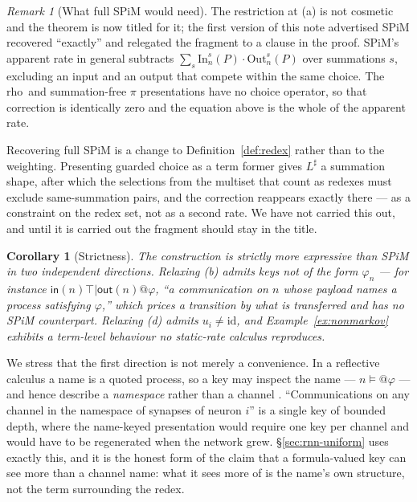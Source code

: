 \documentclass[11pt,a4paper]{article}
\theoremstyle{plain}
\newtheorem{corollary}[theorem]{Corollary}
\theoremstyle{definition}
\theoremstyle{remark}
\newtheorem{remark}[theorem]{Remark}
\newcommand{\rhoc}{\textsf{rho}}
\newcommand{\sepc}{\mathbin{\big|}}
\newcommand{\out}{\mathsf{out}}
\newcommand{\inn}{\mathsf{in}}
\begin{document}
\begin{remark}[What full SPiM would need]
\label{rem:spim-scope}
The restriction at (a) is not cosmetic and the theorem is now titled for it; the first version of
this note advertised SPiM recovered ``exactly'' and relegated the fragment to a clause in the proof.
SPiM's apparent rate in general subtracts $\sum_{s}\mathrm{In}_n^s(P)\cdot\mathrm{Out}_n^s(P)$ over
summations $s$, excluding an input and an output that compete within the same choice. The \rhoc\ and
summation-free $\pi$ presentations have no choice operator, so that correction is identically zero
and the equation above is the whole of the apparent rate.

Recovering full SPiM is a change to Definition~\ref{def:redex} rather than to the weighting.
Presenting guarded choice as a term former gives $L^\sharp$ a summation shape, after which the
selections from the multiset that count as redexes must exclude same-summation pairs, and the
correction reappears exactly there --- as a constraint on the redex set, not as a second rate. We
have not carried this out, and until it is carried out the fragment should stay in the title.
\end{remark}

\begin{corollary}[Strictness]
\label{cor:strict}
The construction is strictly more expressive than SPiM in two independent directions. Relaxing (b)
admits keys not of the form $\varphi_n$ --- for instance
$\inn(n)\top \sepc \out(n)@\varphi$, ``a communication on $n$ whose payload names a process
satisfying $\varphi$,'' which prices a transition by what is transferred and has no SPiM
counterpart. Relaxing (d) admits $u_i \neq \mathrm{id}$, and Example~\ref{ex:nonmarkov} exhibits a
term-level behaviour no static-rate calculus reproduces.
\end{corollary}

We stress that the first direction is not merely a convenience. In a reflective calculus a name is a
quoted process, so a key may inspect the name --- $n \models @\varphi$ --- and hence describe a
\emph{namespace} rather than a channel \cite{namespace}. ``Communications on any channel in the
namespace of synapses of neuron $i$'' is a single key of bounded depth, where the name-keyed
presentation would require one key per channel and would have to be regenerated when the network
grew. \S\ref{sec:rnn-uniform} uses exactly this, and it is the honest form of the claim that a
formula-valued key can see more than a channel name: what it sees more of is the name's own
structure, not the term surrounding the redex.
\end{document}
